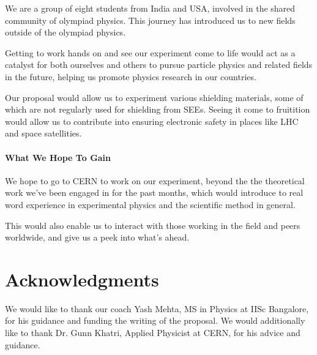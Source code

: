 \documentclass{article}
\begin{document}
We are a group of eight students from India and USA, involved in the shared community of olympiad physics. 
This journey has introduced us to new fields outside of the olympiad physics.

Getting to work hands on and see our experiment come to life would act as a catalyst for both ourselves and others
to pursue particle physics and related fields in the future, helping us promote physics research in our countries.

Our proposal would allow us to experiment various shielding materials, some of which are not regularly used for shielding
from SEEs. Seeing it come to fruitition would allow us to contribute into 
ensuring electronic safety in places like LHC and space satellities.

\subsection*{What We Hope To Gain}

We hope to go to CERN to work on our experiment, beyond the the theoretical work we've been engaged in for the 
past months, which would introduce to real word experience in experimental physics and the scientific method in general.  

This would also enable us to interact with those working in the field and peers worldwide, and give us a peek into what's ahead.

\vspace{-3em}
\part*{Acknowledgments}

We would like to thank our coach Yash Mehta, MS in Physics at IISc Bangalore, for his guidance and funding the writing of the proposal.
We would additionally like to thank Dr. Gunn Khatri, Applied Physicist at CERN, for his advice and guidance.

\newpage
\vspace*{-5.5em}

\end{document}
